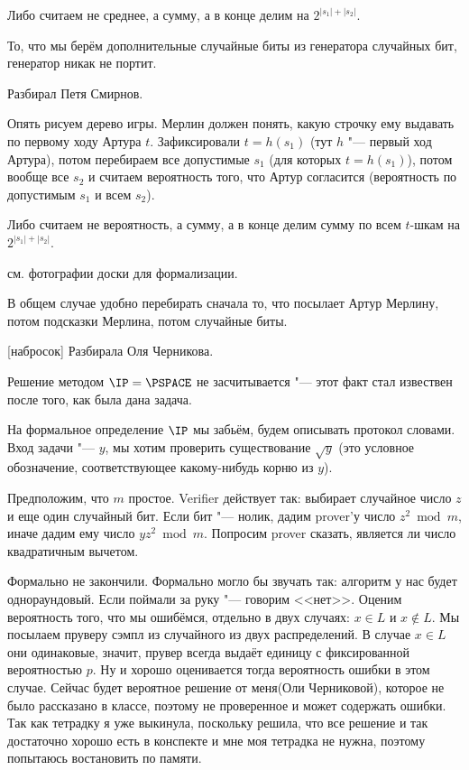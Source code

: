 	Либо считаем не среднее, а сумму, а в конце делим на $2^{|s_1|+|s_2|}$.

	\begin{Rem}
		То, что мы берём дополнительные случайные биты из генератора случайных бит, генератор никак не портит.
	\end{Rem}

	Разбирал Петя Смирнов.

	Опять рисуем дерево игры.
	Мерлин должен понять, какую строчку ему выдавать по первому ходу Артура $t$.
	Зафиксировали $t=h(s_1)$ (тут $h$ "--- первый ход Артура), потом перебираем
	все допустимые $s_1$ (для которых $t=h(s_1)$), потом вообще все $s_2$ и считаем вероятность того,
	что Артур согласится (вероятность по допустимым $s_1$ и всем $s_2$).

	Либо считаем не вероятность, а сумму, а в конце делим сумму по всем $t$-шкам на $2^{|s_1|+|s_2|}$.

	\TODO см. фотографии доски для формализации.

	\begin{Rem}
		В общем случае удобно перебирать сначала то, что посылает Артур Мерлину, потом
		подсказки Мерлина, потом случайные биты.
	\end{Rem}

[набросок]
	Разбирала Оля Черникова.

	\begin{Rem}
		Решение методом $\IP=\PSPACE$ не засчитывается "--- этот факт стал извествен после того, как была дана задача.
	\end{Rem}

	На формальное определение $\IP$ мы забьём, будем описывать протокол словами.
	Вход задачи "--- $y$, мы хотим проверить существование $\sqrt y$ (это условное обозначение,
	соответствующее какому-нибудь корню из $y$).

	Предположим, что $m$ простое.
	Verifier действует так: выбирает случайное число $z$ и еще один случайный бит.
	Если бит "--- нолик, дадим prover'у число $z^2 \bmod m$, иначе дадим ему число $yz^2 \bmod m$.
	Попросим prover сказать, является ли число квадратичным вычетом.

	Формально не закончили.
	Формально могло бы звучать так: алгоритм у нас будет однораундовый.
	Если поймали за руку "--- говорим <<нет>>.
	Оценим вероятность того, что мы ошибёмся, отдельно в двух случаях: $x \in L$ и $x \notin L$.
	Мы посылаем пруверу сэмпл из случайного из двух распределений.
	В случае $x \in L$ они одинаковые, значит, прувер всегда выдаёт единицу с фиксированной вероятностью $p$.
	Ну и хорошо оценивается тогда вероятность ошибки в этом случае.
	Сейчас будет вероятное решение от меня(Оли Черниковой), которое не было рассказано в классе,
	поэтому не проверенное и может содержать ошибки. Так как тетрадку я уже выкинула, поскольку решила, что 
	все решение и так достаточно хорошо есть в конспекте и мне моя тетрадка не нужна, поэтому попытаюсь востановить по памяти. 

